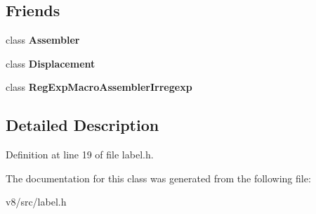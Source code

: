 \subsection*{Friends}
\begin{DoxyCompactItemize}
\item 
\mbox{\label{classv8_1_1internal_1_1Label_a08829e094e460cdd0df495c883c39ce2}} 
class {\bfseries Assembler}
\item 
\mbox{\label{classv8_1_1internal_1_1Label_a14d5cd48e152856eb738eaee8144d357}} 
class {\bfseries Displacement}
\item 
\mbox{\label{classv8_1_1internal_1_1Label_a759a5177df4b99390b15abe3f6636449}} 
class {\bfseries Reg\+Exp\+Macro\+Assembler\+Irregexp}
\end{DoxyCompactItemize}


\subsection{Detailed Description}


Definition at line 19 of file label.\+h.



The documentation for this class was generated from the following file\+:\begin{DoxyCompactItemize}
\item 
v8/src/label.\+h\end{DoxyCompactItemize}
